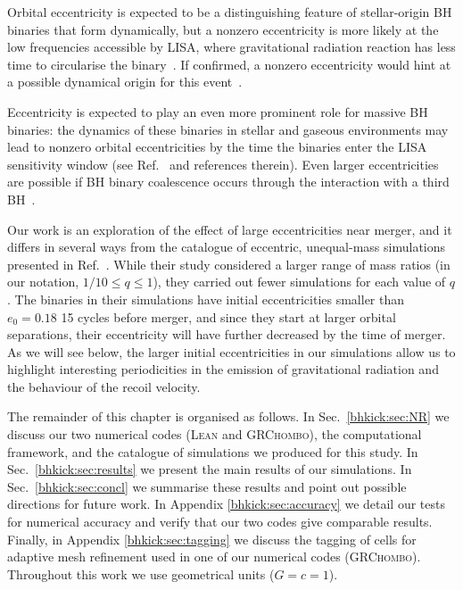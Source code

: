 Orbital eccentricity is expected to be a distinguishing feature of
stellar-origin BH binaries that form dynamically, but a nonzero
eccentricity is more likely at the low frequencies accessible by LISA,
where gravitational radiation reaction has less time to circularise
the binary~\cite{Nishizawa:2016jji,Breivik:2016ddj,Nishizawa:2016eza}.
If confirmed, a nonzero eccentricity would hint at a possible
dynamical origin for this event~\cite{Romero-Shaw:2020thy}.

Eccentricity is expected to play an even more prominent role for massive
BH binaries: the dynamics of these binaries in stellar and gaseous
environments may lead to nonzero orbital eccentricities by the time the
binaries enter the LISA sensitivity window (see Ref.~\cite{Roedig:2011rn} and references
therein). Even larger eccentricities are possible if BH binary
coalescence occurs through the interaction with a third
BH~\cite{Bonetti:2018tpf}.

Our work is an exploration of the effect of large eccentricities near
merger, and it differs in several ways from the catalogue of eccentric,
unequal-mass simulations presented in Ref.~\cite{Huerta:2019oxn}.
While their study considered a larger range of mass ratios (in our
notation, $1/10\leq q\leq 1$), they carried out fewer simulations for
each value of $q$. The binaries in their simulations have initial
eccentricities smaller than $e_0 = 0.18$ 15 cycles before merger,
and since they start at larger orbital separations,
their eccentricity will have further decreased by the time of merger.
As we will see below, the larger initial eccentricities in
our simulations allow us to highlight interesting periodicities in the
emission of gravitational radiation and the behaviour of the recoil
velocity.

The remainder of this chapter is organised as follows.
%
In Sec.~\ref{bhkick:sec:NR} we discuss our two numerical codes (\textsc{Lean}
and \textsc{GRChombo}), the computational framework, and the catalogue
of simulations we produced for this study. In Sec.~\ref{bhkick:sec:results}
we present the main results of our simulations. In
Sec.~\ref{bhkick:sec:concl} we summarise these results and point out possible
directions for future work. In Appendix \ref{bhkick:sec:accuracy} we
detail our tests for numerical accuracy and verify that
our two codes give comparable results.
Finally, in Appendix \ref{bhkick:sec:tagging} we
discuss the tagging of cells for adaptive mesh refinement used in one
of our numerical codes (\textsc{GRChombo}).
%
Throughout this work we use geometrical units ($G=c=1$).

